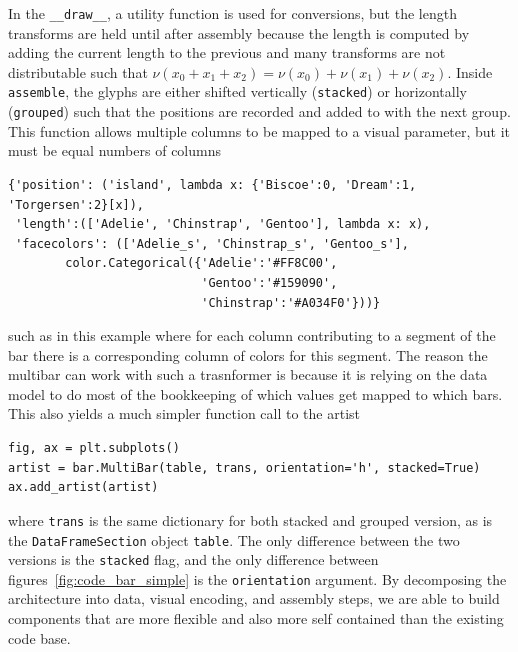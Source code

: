 \documentclass[../main.tex]{subfiles}
\begin{document}
In the \texttt{__draw__}, a utility function is used for conversions, but the length transforms are held until after assembly because the length is computed by adding the current length to the previous and many transforms are not distributable such that $\nu(x_0 + x_1 + x_2) = \nu(x_0) + \nu(x_1) + \nu(x_2)$. Inside \texttt{assemble}, the glyphs are either shifted vertically (\texttt{stacked}) or horizontally (\texttt{grouped}) such that the positions are recorded and added to with the next group. This function allows multiple columns to be mapped to a visual parameter, but it must be equal numbers of columns
\begin{verbatim}
{'position': ('island', lambda x: {'Biscoe':0, 'Dream':1, 'Torgersen':2}[x]),
 'length':(['Adelie', 'Chinstrap', 'Gentoo'], lambda x: x),
 'facecolors': (['Adelie_s', 'Chinstrap_s', 'Gentoo_s'], 
        color.Categorical({'Adelie':'#FF8C00',
                           'Gentoo':'#159090', 
                           'Chinstrap':'#A034F0'}))}
\end{verbatim}
such as in this example where for each column contributing to a segment of the bar there is a corresponding column of colors for this segment. The reason the multibar can work with such a trasnformer is because it is relying on the data model to do most of the bookkeeping of which values get mapped to which bars. This also yields a much simpler function call to the artist

\begin{verbatim}
fig, ax = plt.subplots()
artist = bar.MultiBar(table, trans, orientation='h', stacked=True)
ax.add_artist(artist)
\end{verbatim}

where \texttt{trans} is the same dictionary for both stacked and grouped version, as is the \texttt{DataFrameSection} object \texttt{table}. The only difference between the two versions is the \texttt{stacked} flag, and the only difference between figures~\ref{fig:code_bar_simple} is the \texttt{orientation} argument. By decomposing the architecture into data, visual encoding, and assembly steps, we are able to build components that are more flexible and also more self contained than the existing code base. 


\end{document}
